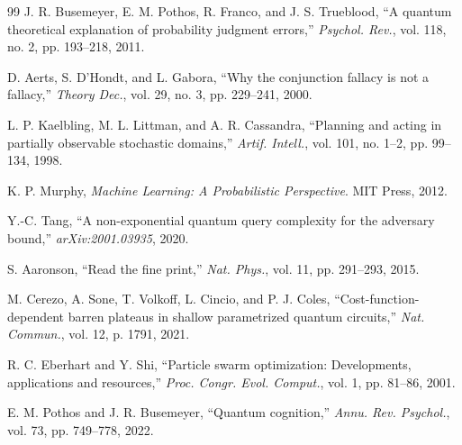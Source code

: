 \documentclass[conference]{IEEEtran}
\begin{document}
\begin{thebibliography}{99}
 J. R. Busemeyer, E. M. Pothos, R. Franco, and J. S. Trueblood, ``A quantum theoretical explanation of probability judgment errors,'' \textit{Psychol. Rev.}, vol. 118, no. 2, pp. 193--218, 2011.

 D. Aerts, S. D'Hondt, and L. Gabora, ``Why the conjunction fallacy is not a fallacy,'' \textit{Theory Dec.}, vol. 29, no. 3, pp. 229--241, 2000.

 L. P. Kaelbling, M. L. Littman, and A. R. Cassandra, ``Planning and acting in partially observable stochastic domains,'' \textit{Artif. Intell.}, vol. 101, no. 1--2, pp. 99--134, 1998.

 K. P. Murphy, \textit{Machine Learning: A Probabilistic Perspective}. MIT Press, 2012.

 Y.-C. Tang, ``A non-exponential quantum query complexity for the adversary bound,'' \textit{arXiv:2001.03935}, 2020.

 S. Aaronson, ``Read the fine print,'' \textit{Nat. Phys.}, vol. 11, pp. 291--293, 2015.

 M. Cerezo, A. Sone, T. Volkoff, L. Cincio, and P. J. Coles, ``Cost-function-dependent barren plateaus in shallow parametrized quantum circuits,'' \textit{Nat. Commun.}, vol. 12, p. 1791, 2021.

 R. C. Eberhart and Y. Shi, ``Particle swarm optimization: Developments, applications and resources,'' \textit{Proc. Congr. Evol. Comput.}, vol. 1, pp. 81--86, 2001.

 E. M. Pothos and J. R. Busemeyer, ``Quantum cognition,'' \textit{Annu. Rev. Psychol.}, vol. 73, pp. 749--778, 2022.

\end{thebibliography}
\end{document}

